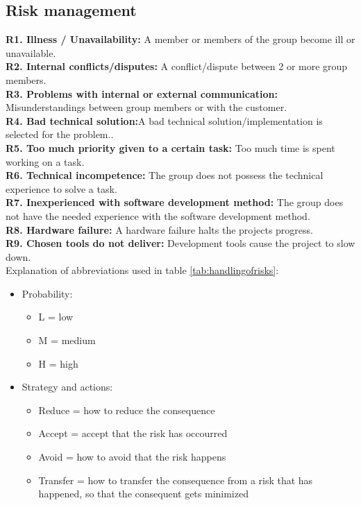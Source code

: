 

\subsection{Risk management}

\textbf{R1. Illness / Unavailability:} A member or members of the group become ill or unavailable. \\
\textbf{R2. Internal conflicts/disputes:} A conflict/dispute between 2 or more group members. \\
\textbf{R3. Problems with internal or external communication:} Misunderstandings between group members or with the customer. \\
\textbf{R4. Bad technical solution:}A bad technical solution/implementation is selected for the problem.. \\
\textbf{R5. Too much priority given to a certain task:} Too much time is spent working on a task. \\
\textbf{R6. Technical incompetence:} The group does not possess the technical experience to solve a task. \\
\textbf{R7. Inexperienced with software development method:} The group does not have the needed experience with the software development method. \\
\textbf{R8. Hardware failure:} A hardware failure halts the projects progress. \\
\textbf{R9. Chosen tools do not deliver:} Development tools cause the project to slow down. \\

Explanation of abbreviations used in table \ref{tab:handlingofrisks}:
\begin{itemize}
\item{}Probability:
\begin{itemize}
\item{}L = low
\item{}M = medium
\item{}H = high
\end{itemize}
\item{}Strategy and actions:
\begin{itemize}
\item{}Reduce = how to reduce the consequence
\item{}Accept = accept that the risk has occourred
\item{}Avoid = how to avoid that the risk happens
\item{}Transfer = how to transfer the consequence from a risk that has happened, so that the consequent gets minimized
\end{itemize}
\end{itemize}

